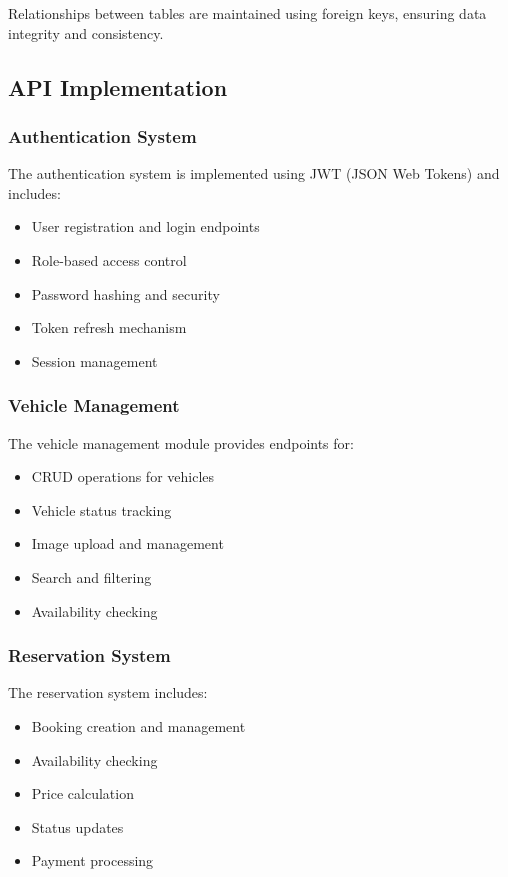 Relationships between tables are maintained using foreign keys, ensuring data integrity and consistency.

\subsection{API Implementation}
\subsubsection{Authentication System}
The authentication system is implemented using JWT (JSON Web Tokens) and includes:

\begin{itemize}
    \item User registration and login endpoints
    \item Role-based access control
    \item Password hashing and security
    \item Token refresh mechanism
    \item Session management
\end{itemize}

\subsubsection{Vehicle Management}
The vehicle management module provides endpoints for:

\begin{itemize}
    \item CRUD operations for vehicles
    \item Vehicle status tracking
    \item Image upload and management
    \item Search and filtering
    \item Availability checking
\end{itemize}

\subsubsection{Reservation System}
The reservation system includes:

\begin{itemize}
    \item Booking creation and management
    \item Availability checking
    \item Price calculation
    \item Status updates
    \item Payment processing
\end{itemize}

